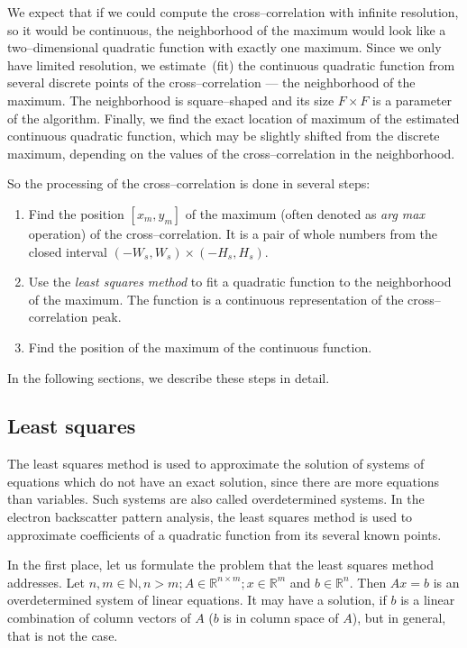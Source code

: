 We expect that if we could compute the cross--correlation with infinite resolution, so it would be continuous, the neighborhood of the maximum would look like a two--dimensional quadratic function with exactly one maximum. Since we only have limited resolution, we estimate~(fit) the continuous quadratic function from several discrete points of the cross--correlation --- the neighborhood of the maximum. The neighborhood is square--shaped and its size $F \times F$ is a parameter of the algorithm. Finally, we find the exact location of maximum of the estimated continuous quadratic function, which may be slightly shifted from the discrete maximum, depending on the values of the cross--correlation in the neighborhood.


So the processing of the cross--correlation is done in several steps:
\begin{enumerate}
	\item Find the position $[x_m,y_m]$ of the maximum (often denoted as \emph{arg max} operation) of the cross--correlation. It is a pair of whole numbers from the closed interval $(-W_s, W_s) \times (-H_s, H_s)$.
	\item Use the \emph{least squares method} to fit a quadratic function to the neighborhood of the maximum. The function is a continuous representation of the cross--correlation peak.
	\item Find the position of the maximum of the continuous function.
\end{enumerate}

In the following sections, we describe these steps in detail.

\subsection{Least squares}
The least squares method is used to approximate the solution of systems of equations which do not have an exact solution, since there are more equations than variables. Such systems are also called overdetermined systems. In the electron backscatter pattern analysis, the least squares method is used to approximate coefficients of a quadratic function from its several known points.

In the first place, let us formulate the problem that the least squares method addresses. Let $n,m \in \mathbb{N}, n > m; A \in \mathbb{R}^{n \times m}; x \in \mathbb{R}^m$ and $b \in \mathbb{R}^n$. Then $Ax = b$ is an overdetermined system of linear equations. It may have a solution, if $b$ is a linear combination of column vectors of $A$ ($b$ is in column space of $A$), but in general, that is not the case.

